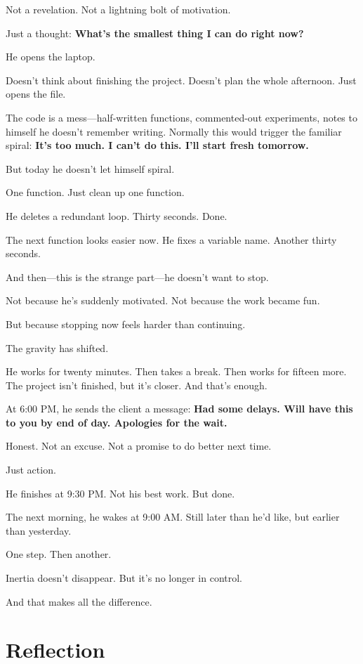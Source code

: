\documentclass[11pt,twoside]{book}
\begin{document}
Not a revelation. Not a lightning bolt of motivation.

Just a thought: \textbf{What's the smallest thing I can do right now?}

He opens the laptop.

Doesn't think about finishing the project. Doesn't plan the whole afternoon. Just opens the file.

The code is a mess—half-written functions, commented-out experiments, notes to himself he doesn't remember writing. Normally this would trigger the familiar spiral: \textbf{It's too much. I can't do this. I'll start fresh tomorrow.}

But today he doesn't let himself spiral.

One function. Just clean up one function.

He deletes a redundant loop. Thirty seconds. Done.

The next function looks easier now. He fixes a variable name. Another thirty seconds.

And then—this is the strange part—he doesn't want to stop.

Not because he's suddenly motivated. Not because the work became fun.

But because stopping now feels harder than continuing.

The gravity has shifted.

He works for twenty minutes. Then takes a break. Then works for fifteen more. The project isn't finished, but it's closer. And that's enough.

At 6:00 PM, he sends the client a message: \textbf{Had some delays. Will have this to you by end of day. Apologies for the wait.}

Honest. Not an excuse. Not a promise to do better next time.

Just action.

He finishes at 9:30 PM. Not his best work. But done.

The next morning, he wakes at 9:00 AM. Still later than he'd like, but earlier than yesterday.

One step. Then another.

Inertia doesn't disappear. But it's no longer in control.

And that makes all the difference.

\section*{Reflection}
\end{document}
